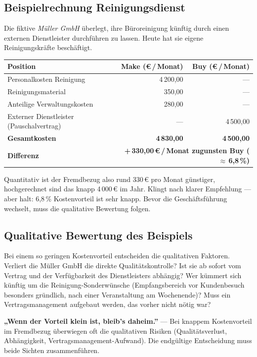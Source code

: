 \documentclass[11pt, a4paper]{article}
\begin{document}
\subsection{Beispielrechnung Reinigungsdienst}

Die fiktive \emph{Müller GmbH} überlegt, ihre Büroreinigung künftig durch einen externen
Dienstleister durchführen zu lassen. Heute hat sie eigene Reinigungskräfte beschäftigt.

\begin{center}
\begin{tabular}{p{6cm} r r}
\toprule
\textbf{Position} & \textbf{Make (€\,/\,Monat)} & \textbf{Buy (€\,/\,Monat)}\\
\midrule
Personalkosten Reinigung & 4\,200,00 & --- \\
Reinigungsmaterial & 350,00 & --- \\
Anteilige Verwaltungskosten & 280,00 & --- \\
Externer Dienstleister (Pauschalvertrag) & --- & 4\,500,00 \\
\midrule
\textbf{Gesamtkosten} & \textbf{4\,830,00} & \textbf{4\,500,00}\\
\midrule
\textbf{Differenz} & \multicolumn{2}{r}{\textbf{+\,330,00\,€\,/\,Monat zugunsten Buy ($\approx$\,6{,}8\,\%)}}\\
\bottomrule
\end{tabular}
\end{center}

Quantitativ ist der Fremdbezug also rund 330\,€ pro Monat günstiger, hochgerechnet
sind das knapp 4\,000\,€ im Jahr. Klingt nach klarer Empfehlung --- aber halt:
6,8\,\% Kostenvorteil ist sehr knapp. Bevor die Geschäftsführung wechselt, muss die
qualitative Bewertung folgen.

\subsection{Qualitative Bewertung des Beispiels}

Bei einem so geringen Kostenvorteil entscheiden die qualitativen Faktoren. Verliert
die Müller GmbH die direkte Qualitätskontrolle? Ist sie ab sofort vom Vertrag und der
Verfügbarkeit des Dienstleisters abhängig? Wer kümmert sich künftig um die
Reinigung-Sonderwünsche (Empfangsbereich vor Kundenbesuch besonders gründlich,
nach einer Veranstaltung am Wochenende)? Muss ein Vertragsmanagement aufgebaut
werden, das vorher nicht nötig war?

\begin{eselsbruecke}
\textbf{„Wenn der Vorteil klein ist, bleib's daheim.”} --- Bei knappem Kostenvorteil
im Fremdbezug überwiegen oft die qualitativen Risiken (Qualitätsverlust, Abhängigkeit,
Vertragsmanagement-Aufwand). Die endgültige Entscheidung muss beide Sichten
zusammenführen.
\end{eselsbruecke}
\end{document}
